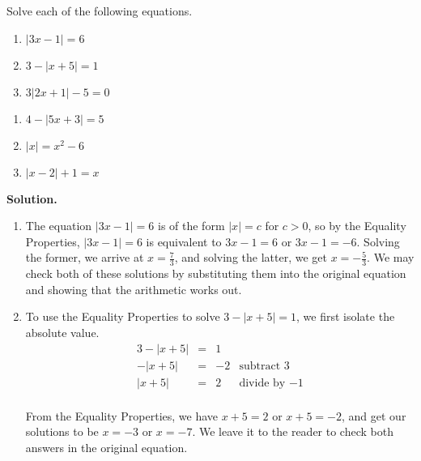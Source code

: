 \begin{ex} \label{absvalueeqnex}  Solve each of the following equations.

\begin{multicols}{3}
\begin{enumerate}

\item  $|3x-1| = 6$
\item  $3 - |x+5| = 1$
\item  $3|2x+1| - 5 = 0$

\setcounter{HW}{\value{enumi}}
\end{enumerate}
\end{multicols}

\begin{multicols}{3}
\begin{enumerate}
\setcounter{enumi}{\value{HW}}

\item  $4 - |5x+3| = 5$
\item  $|x| = x^2-6$
\item  $|x-2| + 1 = x$

\end{enumerate}
\end{multicols}

{\bf Solution.} 

\begin{enumerate}

\item  The equation  $|3x-1| = 6$ is of the form $|x| = c$ for $c>0$, so by the Equality Properties, $|3x-1| = 6$ is equivalent to $3x-1=6$ or $3x-1 = -6$.  Solving the former, we arrive at $x = \frac{7}{3}$, and solving the latter, we get $x = -\frac{5}{3}$.  We may check both of these solutions by substituting them into the original equation and showing that the arithmetic works out.

\item  To use the Equality Properties to solve $3 - |x+5| = 1$, we first isolate the absolute value. \[ \begin{array}{rclr}

3 - |x+5| & = & 1 &  \\
-|x+5| & = & -2 & \text{subtract $3$} \\
|x+5| & = & 2 & \text{divide by $-1$}  \\ 

\end{array} \]

From the Equality Properties, we have $x+5 = 2$ or $x+5 = -2$, and get our solutions to be $x = -3$ or $x = -7$.  We leave it to the reader to check both answers in the original equation.


\end{enumerate}
\end{ex}
